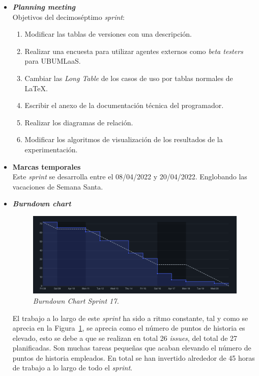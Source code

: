 \begin{itemize}
\item \textbf{\textit{Planning meeting}}\\
Objetivos del decimoséptimo \textit{sprint}:
\begin{enumerate}
\item Modificar las tablas de versiones con una descripción.
\item Realizar una encuesta para utilizar agentes externos como \textit{beta testers} para UBUMLaaS.
\item Cambiar las \textit{Long Table} de los casos de uso por tablas normales de \LaTeX.
\item Escribir el anexo de la documentación técnica del programador.
\item Realizar los diagramas de relación.
\item Modificar los algoritmos de visualización de los resultados de la experimentación.
\end{enumerate}

\item \textbf{Marcas temporales}\\
Este \textit{sprint} se desarrolla entre el 08/04/2022 y 20/04/2022. Englobando las vacaciones de Semana Santa.

\item \textbf{\textit{Burndown chart}}\\
\begin{figure}
\begin{center}
\includegraphics[width=\textwidth]{../img/anexos/sprints/BD-Sprint17}
\caption{\textit{Burndown Chart Sprint 17.}}\label{fig:BD-Sprint17}
\end{center}
\end{figure}
El trabajo a lo largo de este \textit{sprint} ha sido a ritmo constante, tal y como se aprecia en la Figura~\ref{fig:BD-Sprint17}, se aprecia como el número de puntos de historia es elevado, esto se debe a que se realizan en total 26 \textit{issues}, del total de 27 planificadas. Son muchas tareas pequeñas que acaban elevando el número de puntos de historia empleados. En total se han invertido alrededor de 45 horas de trabajo a lo largo de todo el \textit{sprint}.


\end{itemize}
